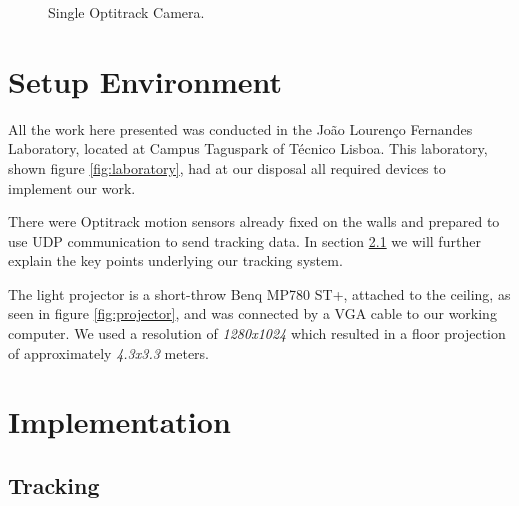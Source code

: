 \begin{figure}[!t]
    \caption{Single Optitrack Camera.}
    \label{fig:optitracksensor}
    \endminipage
\end{figure}

\section{Setup Environment}

All the work here presented was conducted in the Jo\~ao Louren\c{c}o Fernandes Laboratory, located at Campus Taguspark of T\'ecnico Lisboa. This laboratory, shown figure \ref{fig:laboratory}, had at our disposal all required devices to implement our work.

There were Optitrack motion sensors already fixed on the walls and prepared to use UDP communication to send tracking data. 
In section \ref{prototype-tracking} we will further explain the key points underlying our tracking system.

The light projector is a short-throw Benq MP780 ST+, attached to the ceiling, as seen in figure \ref{fig:projector}, and
was connected by a VGA cable to our working computer. We used a resolution of \textit{1280x1024} which resulted in a floor projection of approximately \textit{4.3x3.3} 
meters.

\section{Implementation}

\subsection{Tracking}
\label{prototype-tracking}

